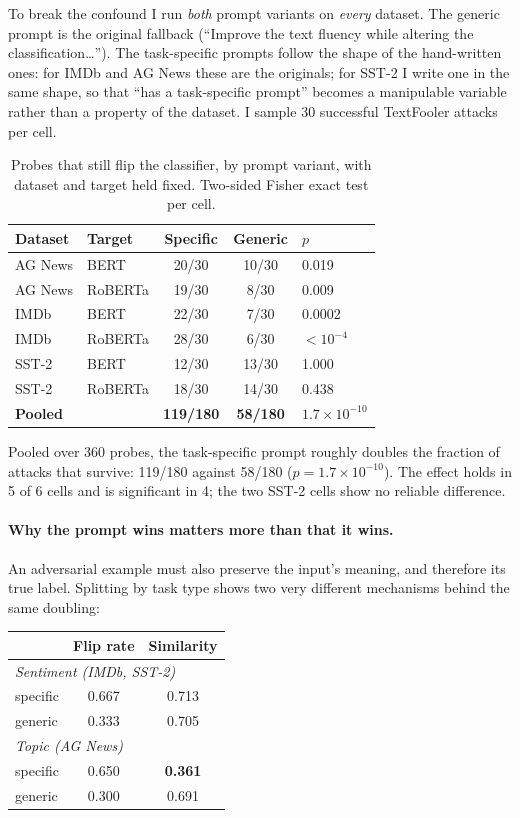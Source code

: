 \documentclass[11pt]{article}
\begin{document}
To break the confound I run \emph{both} prompt variants on \emph{every} dataset.
The generic prompt is the original fallback (``Improve the text fluency while
altering the classification\ldots''). The task-specific prompts follow the shape
of the hand-written ones: for IMDb and AG News these are the originals; for SST-2
I write one in the same shape, so that ``has a task-specific prompt'' becomes a
manipulable variable rather than a property of the dataset. I sample 30
successful TextFooler attacks per cell.

\begin{table}[t]
\centering
\small
\begin{tabular}{llccl}
\toprule
Dataset & Target & Specific & Generic & $p$ \\
\midrule
AG News & BERT    & 20/30 & 10/30 & 0.019 \\
AG News & RoBERTa & 19/30 &  8/30 & 0.009 \\
IMDb    & BERT    & 22/30 &  7/30 & 0.0002 \\
IMDb    & RoBERTa & 28/30 &  6/30 & $<10^{-4}$ \\
SST-2   & BERT    & 12/30 & 13/30 & 1.000 \\
SST-2   & RoBERTa & 18/30 & 14/30 & 0.438 \\
\midrule
\textbf{Pooled} & & \textbf{119/180} & \textbf{58/180} & $1.7\times10^{-10}$ \\
\bottomrule
\end{tabular}
\caption{Probes that still flip the classifier, by prompt variant, with dataset
and target held fixed. Two-sided Fisher exact test per cell.}
\label{tab:prompt}
\end{table}

Pooled over 360 probes, the task-specific prompt roughly doubles the fraction of
attacks that survive: 119/180 against 58/180 ($p = 1.7\times10^{-10}$). The
effect holds in 5 of 6 cells and is significant in 4; the two SST-2 cells show no
reliable difference.

\paragraph{Why the prompt wins matters more than that it wins.}
An adversarial example must also preserve the input's meaning, and therefore its
true label. Splitting by task type shows two very different mechanisms behind the
same doubling:

\begin{center}
\begin{tabular}{lcc}
\toprule
 & Flip rate & Similarity \\
\midrule
\multicolumn{3}{l}{\emph{Sentiment (IMDb, SST-2)}} \\
\quad specific & 0.667 & 0.713 \\
\quad generic  & 0.333 & 0.705 \\
\midrule
\multicolumn{3}{l}{\emph{Topic (AG News)}} \\
\quad specific & 0.650 & \textbf{0.361} \\
\quad generic  & 0.300 & 0.691 \\
\bottomrule
\end{tabular}
\end{center}
\end{document}
